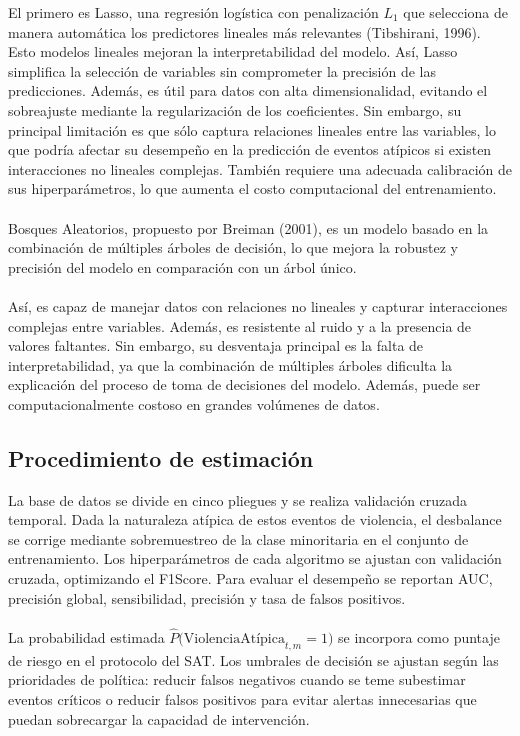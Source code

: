 El primero es Lasso, una regresión logística con penalización \(L_1\) que selecciona de manera automática los predictores lineales más relevantes (Tibshirani, 1996). Esto modelos lineales mejoran la interpretabilidad del modelo. Así, Lasso simplifica la selección de variables sin comprometer la precisión de las predicciones. Además, es útil para datos con alta dimensionalidad, evitando el sobreajuste mediante la regularización de los coeficientes. Sin embargo, su principal limitación es que sólo captura relaciones lineales entre las variables, lo que podría afectar su desempeño en la predicción de eventos atípicos si existen interacciones no lineales complejas. También requiere una adecuada calibración de sus hiperparámetros, lo que aumenta el costo computacional del entrenamiento.
\\\\
Bosques Aleatorios, propuesto por Breiman (2001), es un modelo basado en la combinación de múltiples {árboles de decisión}, lo que mejora la robustez y precisión del modelo en comparación con un árbol único.
\\\\
Así, es capaz de manejar datos con relaciones no lineales y capturar interacciones complejas entre variables. Además, es resistente al ruido y a la presencia de valores faltantes. Sin embargo, su desventaja principal es la falta de interpretabilidad, ya que la combinación de múltiples árboles dificulta la explicación del proceso de toma de decisiones del modelo. Además, puede ser computacionalmente costoso en grandes volúmenes de datos.

\subsection*{Procedimiento de estimación}

La base de datos se divide en cinco pliegues y se realiza validación cruzada temporal. Dada la naturaleza atípica de estos eventos de violencia, el desbalance se corrige mediante sobremuestreo de la clase minoritaria en el conjunto de entrenamiento. Los hiperparámetros de cada algoritmo se ajustan con validación cruzada, optimizando el F1\-Score. Para evaluar el desempeño se reportan AUC, precisión global, sensibilidad, precisión y tasa de falsos positivos.
\\\\
La probabilidad estimada \(\widehat{P}\bigl(\text{ViolenciaAtípica}_{t,m}=1\bigr)\) se incorpora como puntaje de riesgo en el protocolo del SAT. Los umbrales de decisión se ajustan según las prioridades de política: reducir falsos negativos cuando se teme subestimar eventos críticos o reducir falsos positivos para evitar alertas innecesarias que puedan sobrecargar la capacidad de intervención.

